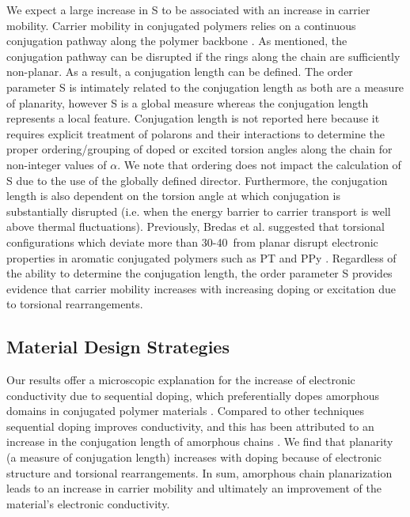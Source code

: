 We expect a large increase in S to be associated with an increase in carrier mobility. Carrier mobility in conjugated polymers relies on a continuous conjugation pathway along the polymer backbone \cite{Shin2010}. As mentioned, the conjugation pathway can be disrupted if the rings along the chain are sufficiently non-planar. As a result, a conjugation length can be defined. The order parameter S is intimately related to the conjugation length as both are a measure of planarity, however S is a global measure whereas the conjugation length represents a local feature. Conjugation length is not reported here because it requires explicit treatment of polarons and their interactions to determine the proper ordering/grouping of doped or excited torsion angles along the chain for non-integer values of $\alpha$. We note that ordering does not impact the calculation of S due to the use of the globally defined director. Furthermore, the conjugation length is also dependent on the torsion angle at which conjugation is substantially disrupted (i.e. when the energy barrier to carrier transport is well above thermal fluctuations). Previously, Bredas et al. suggested that torsional configurations which deviate more than 30-40\textdegree \ from planar disrupt electronic properties in aromatic conjugated polymers such as PT and PPy \cite{Bredas1985}. Regardless of the ability to determine the conjugation length, the order parameter S provides evidence that carrier mobility increases with increasing doping or excitation due to torsional rearrangements.

\subsection{Material Design Strategies}

Our results offer a microscopic explanation for the increase of electronic conductivity due to sequential doping, which preferentially dopes amorphous domains in conjugated polymer materials \cite{Chew2017, Jacobs2016}. Compared to other techniques sequential doping improves conductivity, and this has been attributed to an increase in the conjugation length of amorphous chains \cite{Chew2017}. We find that planarity (a measure of conjugation length) increases with doping because of electronic structure and torsional rearrangements. In sum, amorphous chain planarization leads to an increase in carrier mobility and ultimately an improvement of the material's electronic conductivity.

